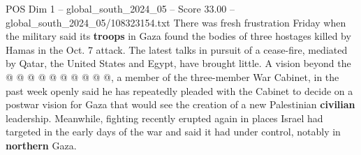 \begin{textsample}{POS Dim 1 – global\_south\_2024\_05 – Score 33.00 – global\_south\_2024\_05/108323154.txt}
There was fresh frustration Friday when the military said its \textbf{troops} in Gaza found the bodies of three hostages killed by Hamas in the Oct. 7 attack.
The latest talks in pursuit of a cease-fire, mediated by Qatar, the United States and Egypt, have brought little.
A vision beyond the @ @ @ @ @ @ @ @ @ @, a member of the three-member War Cabinet, in the past week openly said he has repeatedly pleaded with the Cabinet to decide on a postwar vision for Gaza that would see the creation of a new Palestinian \textbf{civilian} leadership.
Meanwhile, fighting recently erupted again in places Israel had targeted in the early days of the war and said it had under control, notably in \textbf{northern} Gaza.

\end{textsample}
